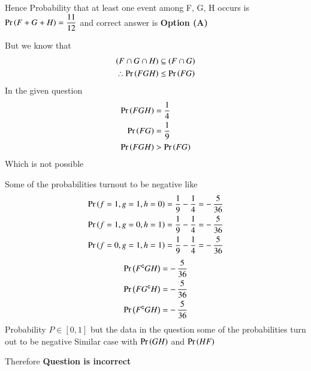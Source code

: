 \documentclass[journal,12pt,twocolumn]{IEEEtran}
\begin{document}
Hence Probability that at least one event among F, G, H occurs is $\Pr\left(F + G + H\right)=\dfrac{11}{12}$ and correct answer is \textbf{Option (A)}
\null \par \null
But we know that 
\begin{align}
(F \cap G \cap H)     &\subseteq (F \cap G) \\
\therefore \Pr\left(F G H\right) &\leq \Pr\left(F G\right) 
\end{align}
In the given question 
\begin{align}
\Pr\left(F G H\right) &= \dfrac{1}{4} \\
\Pr\left(F G\right)   &= \dfrac{1}{9} \\
\Pr\left(F G H\right) &> \Pr\left(F G\right)
\end{align}
Which is not possible

Some of the probabilities turnout to be negative like 
\begin{align*}
\Pr\left(f=1,g=1,h=0\right) &= \dfrac{1}{9} - \dfrac{1}{4} = -\,\dfrac{5}{36} \\
\Pr\left(f=1,g=0,h=1\right) &= \dfrac{1}{9} - \dfrac{1}{4} = -\,\dfrac{5}{36} \\
\Pr\left(f=0,g=1,h=1\right) &= \dfrac{1}{9} - \dfrac{1}{4} = -\,\dfrac{5}{36} 
\end{align*}
\begin{align}
\Pr\left(F^{\mathsf{c}} G H\right)  &= -\,\dfrac{5}{36} \\
\Pr\left(F G^{\mathsf{c}} H\right)  &= -\,\dfrac{5}{36} \\
\Pr\left(F^{\mathsf{c}} G H\right)  &= -\,\dfrac{5}{36}  
\end{align}
Probability $P\in [0,1]$ but the data in the question some of the probabilities turn out to be negative
Similar case with $\Pr\left(G H\right)$ and $\Pr\left(H F\right)$ 

Therefore \textbf{Question is incorrect}
\end{document}
